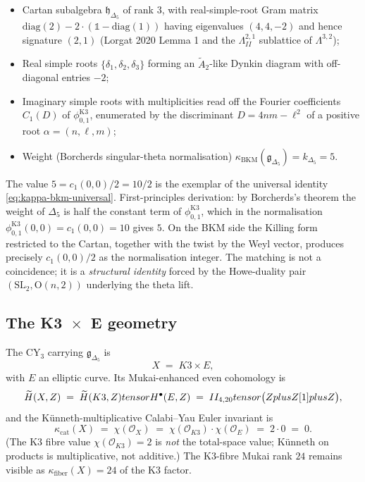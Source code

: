 \begin{itemize}
  \item Cartan subalgebra $\mathfrak h_{\Delta_5}$ of rank $3$, with real-simple-root Gram matrix $\mathrm{diag}(2) - 2 \cdot (\mathbb 1 - \mathrm{diag}(1))$ having eigenvalues $(4, 4, -2)$ and hence signature $(2, 1)$ (Lorgat 2020 Lemma 1 and the $\Lambda^{2,1}_{II}$ sublattice of $\Lambda^{3,2}$);
  \item Real simple roots $\{\delta_1, \delta_2, \delta_3\}$ forming an $\widetilde A_2$-like Dynkin diagram with off-diagonal entries $-2$;
  \item Imaginary simple roots with multiplicities read off the Fourier coefficients $C_1(D)$ of $\phi_{0, 1}^{\mathrm{K3}}$, enumerated by the discriminant $D = 4nm - \ell^2$ of a positive root $\alpha = (n, \ell, m)$;
  \item Weight (Borcherds singular-theta normalisation) $\kappa_{\mathrm{BKM}}(\mathfrak g_{\Delta_5}) = k_{\Delta_5} = 5$.
\end{itemize}

The value $5 = c_1(0, 0)/2 = 10/2$ is the exemplar of the universal identity \eqref{eq:kappa-bkm-universal}. First-principles derivation: by Borcherds's theorem the weight of $\Delta_5$ is half the constant term of $\phi_{0, 1}^{\mathrm{K3}}$, which in the normalisation $\phi_{0, 1}^{\mathrm{K3}}(0, 0) = c_1(0, 0) = 10$ gives $5$. On the BKM side the Killing form restricted to the Cartan, together with the twist by the Weyl vector, produces precisely $c_1(0, 0)/2$ as the normalisation integer. The matching is not a coincidence; it is a \emph{structural identity} forced by the Howe-duality pair $(\mathrm{SL}_2, \mathrm{O}(n, 2))$ underlying the theta lift.

\subsection{The K3~$\times$~E geometry}

The CY$_3$ carrying $\mathfrak g_{\Delta_5}$ is
\[
  X \;=\; K3 \times E,
\]
with $E$ an elliptic curve. Its Mukai-enhanced even cohomology is
\[
  \widetilde H(X, Z) \;=\; \widetilde H(K3, Z) tensor H^\bullet(E, Z) \;=\; II_{4, 20} tensor \bigl(Z plus Z[1] plus Z\bigr),
\]
and the K\"unneth-multiplicative Calabi--Yau Euler invariant is
\[
  \kappa_{\mathrm{cat}}(X) \;=\; \chi(\mathcal O_X) \;=\; \chi(\mathcal O_{K3}) \cdot \chi(\mathcal O_E) \;=\; 2 \cdot 0 \;=\; 0.
\]
(The K3 fibre value $\chi(\mathcal O_{K3}) = 2$ is \emph{not} the total-space value; K\"unneth on products is multiplicative, not additive.) The K3-fibre Mukai rank $24$ remains visible as $\kappa_{\mathrm{fiber}}(X) = 24$ of the K3 factor.

